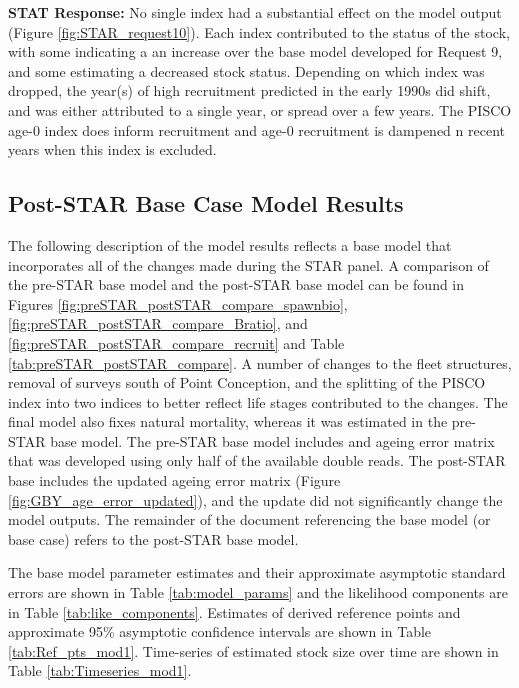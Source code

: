 \documentclass[12pt,]{article}
\begin{document}
\begin{description}[style=sameline]
\textbf{STAT Response:} No single index had a substantial effect on the model output 
(Figure \ref{fig:STAR_request10}). 
Each index contributed to the status of the stock, with some indicating a an increase 
over the base model developed for Request 9, and some estimating a decreased stock status. 
Depending on which index was dropped, the year(s) of high recruitment predicted in the 
early 1990s did shift, and was either attributed to a single year, or spread over a few 
years. The PISCO age-0 index does inform recruitment and age-0 recruitment is dampened 
n recent years when this index is excluded.

\end{description}

\subsection{Post-STAR Base Case Model
Results}\label{post-star-base-case-model-results}

The following description of the model results reflects a base model
that incorporates all of the changes made during the STAR panel. A
comparison of the pre-STAR base model and the post-STAR base model can
be found in Figures \ref{fig:preSTAR_postSTAR_compare_spawnbio},
\ref{fig:preSTAR_postSTAR_compare_Bratio}, and
\ref{fig:preSTAR_postSTAR_compare_recruit} and Table
\ref{tab:preSTAR_postSTAR_compare}. A number of changes to the fleet
structures, removal of surveys south of Point Conception, and the
splitting of the PISCO index into two indices to better reflect life
stages contributed to the changes. The final model also fixes natural
mortality, whereas it was estimated in the pre-STAR base model. The
pre-STAR base model includes and ageing error matrix that was developed
using only half of the available double reads. The post-STAR base
includes the updated ageing error matrix (Figure
\ref{fig:GBY_age_error_updated}), and the update did not significantly
change the model outputs. The remainder of the document referencing the
base model (or base case) refers to the post-STAR base model.

The base model parameter estimates and their approximate asymptotic
standard errors are shown in Table \ref{tab:model_params} and the
likelihood components are in Table \ref{tab:like_components}. Estimates
of derived reference points and approximate 95\% asymptotic confidence
intervals are shown in Table \ref{tab:Ref_pts_mod1}. Time-series of
estimated stock size over time are shown in Table
\ref{tab:Timeseries_mod1}.
\end{document}
